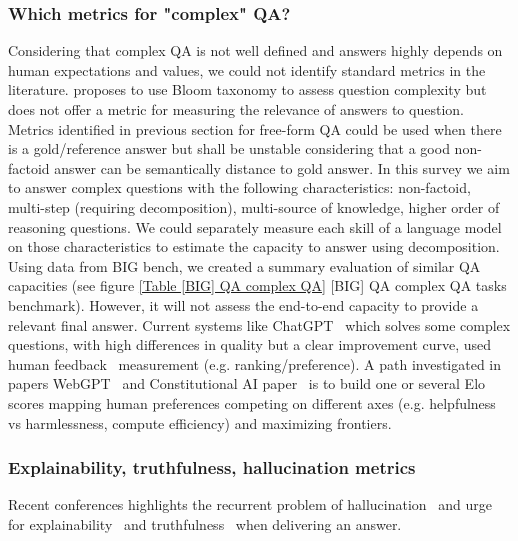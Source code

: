 \documentclass[acmsmall]{acmart}
\begin{document}
\subsubsection{Which metrics for "complex" QA?}

Considering that complex QA is not well defined and answers highly depends on human expectations and values, we could not identify standard metrics in the literature. \citet{ullrichUsingBloomTaxonomy2021} proposes to use Bloom taxonomy to assess question complexity but does not offer a metric for measuring the relevance of answers to question. Metrics identified in previous section for free-form QA could be used when there is a gold/reference answer but shall be unstable considering that a good non-factoid answer can be semantically distance to gold answer. In this survey we aim to answer complex questions with the following characteristics: non-factoid, multi-step (requiring decomposition), multi-source of knowledge, higher order of reasoning questions. We could separately measure each skill of a language model on those characteristics to estimate the capacity to answer using decomposition. Using data from BIG bench, we created a summary evaluation of similar QA capacities (see figure \ref{Table [BIG] QA complex QA} [BIG] QA complex QA tasks benchmark). However, it will not assess the end-to-end capacity to provide a relevant final answer.
Current systems like ChatGPT~\citep{haqueThinkThisMost2022} which solves some complex questions, with high differences in quality but a clear improvement curve, used human feedback~\citep{baiTrainingHelpfulHarmless2022} measurement (e.g. ranking/preference). A path investigated in papers WebGPT~\citep{nakanoWebGPTBrowserassistedQuestionanswering2022} and Constitutional AI paper~\citep{baiConstitutionalAIHarmlessness2022} is to build one or several Elo scores mapping human preferences competing on different axes (e.g. helpfulness vs harmlessness, compute efficiency) and maximizing frontiers.

\subsubsection{Explainability, truthfulness, hallucination metrics}
Recent conferences highlights the recurrent problem of hallucination~\citep{jiSurveyHallucinationNatural2022} and urge for explainability~\citep{leiterExplainableEvaluationMetrics2022, wiegreffeTeachMeExplain2021} and truthfulness~\citep{sopranoManyDimensionsTruthfulness2021, linTruthfulQAMeasuringHow2022} when delivering an answer.
\end{document}

